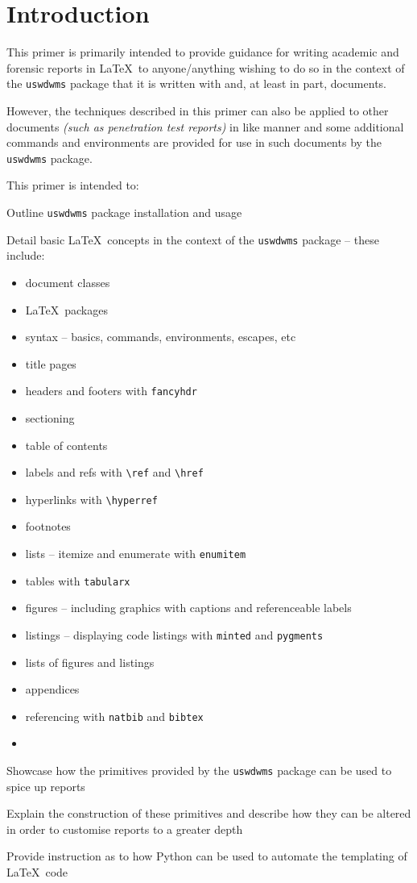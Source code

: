 \section{Introduction}
This primer is primarily intended to provide guidance for writing academic and forensic reports in \LaTeX\ to anyone/anything wishing to do so in the context of the \texttt{uswdwms} package that it is written with and, at least in part, documents.

However, the techniques described in this primer can also be applied to other documents \textit{(such as penetration test reports)} in like manner and some additional commands and environments are provided for use in such documents by the \texttt{uswdwms} package.

This primer is intended to:
\begin{methodology0}
  \item Outline \texttt{uswdwms} package installation and usage
  \item Detail basic \LaTeX\ concepts in the context of the \texttt{uswdwms} package -- these include:
    \begin{itemize}
      \item document classes
      \item \LaTeX\ packages
      \item syntax -- basics, commands, environments, escapes, etc
      \item title pages
      \item headers and footers with \texttt{fancyhdr}
      \item sectioning
      \item table of contents
      \item labels and refs with \texttt{\textbackslash ref} and \texttt{\textbackslash href}
      \item hyperlinks with \texttt{\textbackslash hyperref}
      \item footnotes
      \item lists -- itemize and enumerate with \texttt{enumitem}
      \item tables with \texttt{tabularx}
      \item figures -- including graphics with captions and referenceable labels
      \item listings -- displaying code listings with \texttt{minted} and \texttt{pygments}
      \item lists of figures and listings
      \item appendices
      \item referencing with \texttt{natbib} and \texttt{bibtex}
      \item {}
    \end{itemize}
  \item Showcase how the primitives provided by the \texttt{uswdwms} package can be used to spice up reports
  \item Explain the construction of these primitives and describe how they can be altered in order to customise reports to a greater depth
  \item Provide instruction as to how Python can be used to automate the templating of \LaTeX\ code
\end{methodology0}
